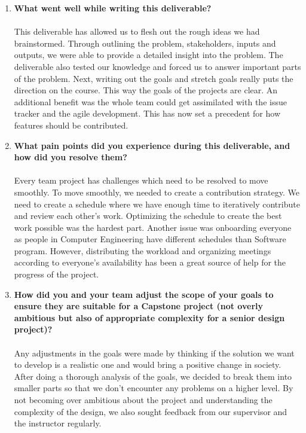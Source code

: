 \documentclass{article}
\begin{document}
\begin{enumerate}
    \item \textbf{What went well while writing this deliverable?}\\\\
    This deliverable has allowed us to flesh out the rough ideas we had brainstormed. Through outlining the problem, stakeholders, inputs and outputs, we were able to provide a detailed insight into the problem. The deliverable also tested our knowledge and forced us to answer important parts of the problem.
    Next, writing out the goals and stretch goals really puts the direction on the course. This way the goals of the projects are clear.
    An additional benefit was the whole team could get assimilated with the issue tracker and the agile development. This has now set a precedent for how features should be contributed.

    \item \textbf{What pain points did you experience during this deliverable, and how did you resolve them?}\\\\
    Every team project has challenges which need to be resolved to move smoothly. To move smoothly, we needed to create a contribution strategy. We need to create a schedule where we have enough time to iteratively contribute and review each other’s work. Optimizing the schedule to create the best work possible was the hardest part. 
    Another issue was onboarding everyone as people in Computer Engineering have different schedules than Software program. However, distributing the workload and organizing meetings according to everyone’s availability has been a great source of help for the progress of the project.  

    \item \textbf{How did you and your team adjust the scope of your goals to ensure they are suitable for a Capstone project (not overly ambitious but also of appropriate complexity for a senior design project)?}\\\\
    Any adjustments in the goals were made by thinking if the solution we want to develop is a realistic one and would bring a positive change in society. After doing a thorough analysis of the goals, we decided to break them into smaller parts so that we don’t encounter any problems on a higher level. By not becoming over ambitious about the project and understanding the complexity of the design, we also sought feedback from our supervisor and the instructor regularly.
\end{enumerate}  
\end{document}
